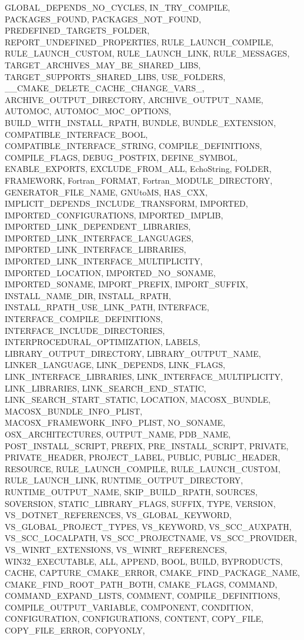 {{      GLOBAL_DEPENDS_NO_CYCLES, IN_TRY_COMPILE, PACKAGES_FOUND,
      PACKAGES_NOT_FOUND, PREDEFINED_TARGETS_FOLDER,
      REPORT_UNDEFINED_PROPERTIES, RULE_LAUNCH_COMPILE, RULE_LAUNCH_CUSTOM,
      RULE_LAUNCH_LINK, RULE_MESSAGES, TARGET_ARCHIVES_MAY_BE_SHARED_LIBS,
      TARGET_SUPPORTS_SHARED_LIBS, USE_FOLDERS,
      __CMAKE_DELETE_CACHE_CHANGE_VARS_, ARCHIVE_OUTPUT_DIRECTORY,
      ARCHIVE_OUTPUT_NAME, AUTOMOC, AUTOMOC_MOC_OPTIONS,
      BUILD_WITH_INSTALL_RPATH, BUNDLE, BUNDLE_EXTENSION,
      COMPATIBLE_INTERFACE_BOOL, COMPATIBLE_INTERFACE_STRING,
      COMPILE_DEFINITIONS, COMPILE_FLAGS, DEBUG_POSTFIX, DEFINE_SYMBOL,
      ENABLE_EXPORTS, EXCLUDE_FROM_ALL, EchoString, FOLDER, FRAMEWORK,
      Fortran_FORMAT, Fortran_MODULE_DIRECTORY, GENERATOR_FILE_NAME,
      GNUtoMS, HAS_CXX, IMPLICIT_DEPENDS_INCLUDE_TRANSFORM, IMPORTED,
      IMPORTED_CONFIGURATIONS, IMPORTED_IMPLIB,
      IMPORTED_LINK_DEPENDENT_LIBRARIES, IMPORTED_LINK_INTERFACE_LANGUAGES,
      IMPORTED_LINK_INTERFACE_LIBRARIES,
      IMPORTED_LINK_INTERFACE_MULTIPLICITY, IMPORTED_LOCATION,
      IMPORTED_NO_SONAME, IMPORTED_SONAME, IMPORT_PREFIX, IMPORT_SUFFIX,
      INSTALL_NAME_DIR, INSTALL_RPATH, INSTALL_RPATH_USE_LINK_PATH,
      INTERFACE, INTERFACE_COMPILE_DEFINITIONS,
      INTERFACE_INCLUDE_DIRECTORIES, INTERPROCEDURAL_OPTIMIZATION, LABELS,
      LIBRARY_OUTPUT_DIRECTORY, LIBRARY_OUTPUT_NAME, LINKER_LANGUAGE,
      LINK_DEPENDS, LINK_FLAGS, LINK_INTERFACE_LIBRARIES,
      LINK_INTERFACE_MULTIPLICITY, LINK_LIBRARIES, LINK_SEARCH_END_STATIC,
      LINK_SEARCH_START_STATIC, LOCATION, MACOSX_BUNDLE,
      MACOSX_BUNDLE_INFO_PLIST, MACOSX_FRAMEWORK_INFO_PLIST, NO_SONAME,
      OSX_ARCHITECTURES, OUTPUT_NAME, PDB_NAME, POST_INSTALL_SCRIPT,
      PREFIX, PRE_INSTALL_SCRIPT, PRIVATE, PRIVATE_HEADER, PROJECT_LABEL,
      PUBLIC, PUBLIC_HEADER, RESOURCE, RULE_LAUNCH_COMPILE,
      RULE_LAUNCH_CUSTOM, RULE_LAUNCH_LINK, RUNTIME_OUTPUT_DIRECTORY,
      RUNTIME_OUTPUT_NAME, SKIP_BUILD_RPATH, SOURCES, SOVERSION,
      STATIC_LIBRARY_FLAGS, SUFFIX, TYPE, VERSION, VS_DOTNET_REFERENCES,
      VS_GLOBAL_KEYWORD, VS_GLOBAL_PROJECT_TYPES, VS_KEYWORD,
      VS_SCC_AUXPATH, VS_SCC_LOCALPATH, VS_SCC_PROJECTNAME,
      VS_SCC_PROVIDER, VS_WINRT_EXTENSIONS, VS_WINRT_REFERENCES,
      WIN32_EXECUTABLE, ALL, APPEND, BOOL, BUILD, BYPRODUCTS, CACHE,
      CAPTURE_CMAKE_ERROR, CMAKE_FIND_PACKAGE_NAME,
      CMAKE_FIND_ROOT_PATH_BOTH, CMAKE_FLAGS, COMMAND,
      COMMAND_EXPAND_LISTS, COMMENT, COMPILE_DEFINITIONS,
      COMPILE_OUTPUT_VARIABLE, COMPONENT, CONDITION, CONFIGURATION,
      CONFIGURATIONS, CONTENT, COPY_FILE, COPY_FILE_ERROR, COPYONLY,
}}
